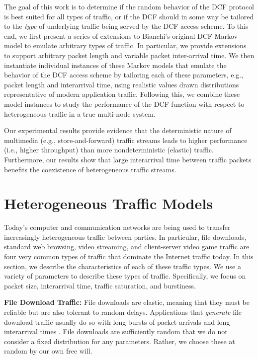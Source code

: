 \documentclass[conference]{IEEEtran}
\begin{document}
The goal of this work is to determine if the random behavior of the DCF protocol is best suited for all types of traffic, or if the DCF should in some way be tailored to the \emph{type} of underlying traffic being served by the DCF access scheme. To this end, we first present a series of extensions to Bianchi's original DCF Markov model to emulate arbitrary types of traffic. In particular, we provide extensions to support arbitrary packet length and variable packet inter-arrival time. We then instantiate individual instances of these Markov models that emulate the behavior of the DCF access scheme by tailoring each of these parameters, e.g., packet length and interarrival time, using realistic values drawn distributions representative of modern application traffic. Following this, we combine these model instances to study the performance of the DCF function with respect to heterogeneous traffic in a true multi-node system. 

Our experimental results provide evidence that the deterministic nature of multimedia (e.g., store-and-forward) traffic streams leads to higher performance (i.e., higher throughput) than more nondeterministic (elastic) traffic. Furthermore, our results show that large interarrival time between traffic packets benefits the coexistence of heterogeneous traffic streams. 

\section{Heterogeneous Traffic Models}
Today's computer and communication networks are being used to transfer increasingly heterogeneous traffic between parties. In particular, file downloads, standard web browsing, video streaming, and client-server video game traffic are four very common types of traffic that dominate the Internet traffic today. In this section, we describe the characteristics of each of these traffic types. We use a variety of parameters to describe these types of traffic. Specifically, we focus on packet size, interarrival time, traffic saturation, and burstiness. 

\noindent
\textbf{File Download Traffic:} File downloads are elastic, meaning that they must be reliable but are also tolerant to random delays. Applications that \emph{generate} file download traffic usually do so with long bursts of packet arrivals and long interarrival times \cite{kumar2004communication}. File downloads are sufficiently random that we do not consider a fixed distribution for any parameters. Rather, we choose these at random by our own free will. 
\end{document}
